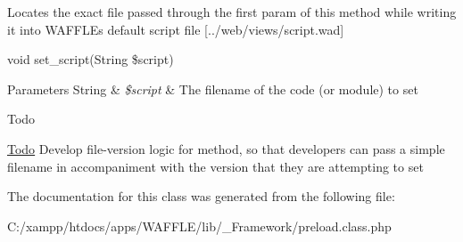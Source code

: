 Locates the exact file passed through the first param of this method while writing it into W\+A\+F\+F\+LE\textquotesingle{}s default script file \mbox{[}../web/views/script.wad\mbox{]}

void set\+\_\+script(String \$script)


\begin{DoxyParams}[1]{Parameters}
String & {\em \$script} & The filename of the code (or module) to set\\
\hline
\end{DoxyParams}
\begin{DoxyRefDesc}{Todo}
\item[\hyperlink{todo__todo000005}{Todo}]Develop file-\/version logic for method, so that developers can pass a simple filename in accompaniment with the version that they are attempting to set \end{DoxyRefDesc}


The documentation for this class was generated from the following file\+:\begin{DoxyCompactItemize}
\item 
C\+:/xampp/htdocs/apps/\+W\+A\+F\+F\+L\+E/lib/\+\_\+\+Framework/preload.\+class.\+php\end{DoxyCompactItemize}
